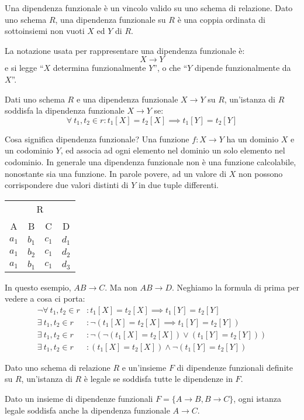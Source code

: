 Una dipendenza funzionale \`e un vincolo valido su uno schema di relazione. Dato uno schema $R$, una dipendenza funzionale su $R$ \`e una coppia ordinata di sottoinsiemi non vuoti $X$ ed $Y$ di $R$.

La notazione usata per rappresentare una dipendenza funzionale \`e:
\[
X \to Y
\]
e si legge ``$X$ determina funzionalmente $Y$'', o che ``$Y$ dipende funzionalmente da $X$''.

Dati uno schema $R$ e una dipendenza funzionale $X \to Y$ su $R$, un'istanza di $R$ soddisfa la dipendenza funzionale $X \to Y$ se:
\[
\forall \ t_1, t_2 \in r : t_1[X]=t_2[X] \implies t_1[Y] = t_2[Y]
\]

Cosa significa dipendenza funzionale? Una funzione $f: X \to Y$ ha un dominio $X$ e un codominio $Y$, ed associa ad ogni elemento nel dominio un solo elemento nel codominio. In generale una dipendenza funzionale non \`e una funzione calcolabile, nonostante sia una funzione. In parole povere, ad un valore di $X$ non possono corrispondere due valori distinti di $Y$ in due tuple differenti.

\begin{center}
\begin{tabular}{cccc}
\multicolumn{4}{c}{R}\\
A & B & C & D \\
\hline
$a_1$ & $b_1$ & $c_1$ & $d_1$ \\
$a_1$ & $b_2$ & $c_1$ & $d_2$ \\
$a_1$ & $b_1$ & $c_1$ & $d_3$ 
\end{tabular}
\end{center}
In questo esempio, $AB \to C$. Ma non $AB \to D$. Neghiamo la formula di prima per vedere a cosa ci porta:
\begin{align*}
\neg \forall \ t_1, t_2 \in r &: t_1[X]=t_2[X] \implies t_1[Y] = t_2[Y] \\
\exists \ t_1, t_2 \in r &: \neg (t_1[X]=t_2[X] \implies t_1[Y] = t_2[Y]) \\
\exists \ t_1, t_2 \in r &: \neg ( \neg (t_1[X]=t_2[X]) \lor (t_1[Y] = t_2[Y])) \\
\exists \ t_1, t_2 \in r &: (t_1[X]=t_2[X]) \land \neg  (t_1[Y] = t_2[Y])
\end{align*}

Dato uno schema di relazione $R$ e un'insieme $F$ di dipendenze funzionali definite su $R$, un'istanza di $R$ \`e legale se soddisfa tutte le dipendenze in $F$.

Dato un insieme di dipendenze funzionali $F = \{ A \to B, B \to C\}$, ogni istanza legale soddisfa anche la dipendenza funzionale $A \to C$.

